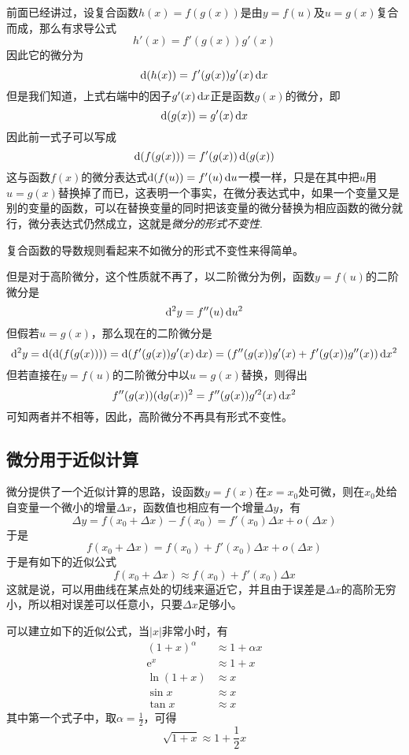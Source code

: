 前面已经讲过，设复合函数$h(x)=f(g(x))$是由$y=f(u)$及$u=g(x)$复合而成，那么有求导公式
\[ h'(x) = f'(g(x))g'(x) \]
因此它的微分为
\[ \mathop{}\!\mathrm{d} (h(x)) = f'(g(x)) g'(x) \mathop{}\!\mathrm{d} x \]
但是我们知道，上式右端中的因子$g'(x) \mathop{}\!\mathrm{d} x$正是函数$g(x)$的微分，即
\[ \mathop{}\!\mathrm{d} (g(x)) = g'(x) \mathop{}\!\mathrm{d} x \]
因此前一式子可以写成
\[ \mathop{}\!\mathrm{d} (f(g(x))) = f'(g(x)) \mathop{}\!\mathrm{d} (g(x)) \]
这与函数$f(x)$的微分表达式$\mathop{}\!\mathrm{d} (f(u)) = f'(u) \mathop{}\!\mathrm{d} u$一模一样，只是在其中把$u$用$u=g(x)$替换掉了而已，这表明一个事实，在微分表达式中，如果一个变量又是别的变量的函数，可以在替换变量的同时把该变量的微分替换为相应函数的微分就行，微分表达式仍然成立，这就是\emph{微分的形式不变性}.

复合函数的导数规则看起来不如微分的形式不变性来得简单。

但是对于高阶微分，这个性质就不再了，以二阶微分为例，函数$y=f(u)$的二阶微分是
\[ \mathop{}\!\mathrm{d}^2 y = f''(u) \mathop{}\!\mathrm{d} u^2 \]
但假若$u=g(x)$，那么现在的二阶微分是
\[ \mathop{}\!\mathrm{d}^2 y = \mathop{}\!\mathrm{d} (\mathop{}\!\mathrm{d} (f(g(x)))) = \mathop{}\!\mathrm{d} (f'(g(x))g'(x)\mathop{}\!\mathrm{d} x) = (f''(g(x))g'(x)+f'(g(x))g''(x)) \mathop{}\!\mathrm{d} x^2 \]
但若直接在$y=f(u)$的二阶微分中以$u=g(x)$替换，则得出
\[ f''(g(x)) (\mathop{}\!\mathrm{d} g(x))^2 = f''(g(x)) g'^2(x) \mathop{}\!\mathrm{d} x^2 \]
可知两者并不相等，因此，高阶微分不再具有形式不变性。

\subsection{微分用于近似计算}
\label{sec:approx-by-differtial}

微分提供了一个近似计算的思路，设函数$y=f(x)$在$x=x_0$处可微，则在$x_0$处给自变量一个微小的增量$\Delta x$，函数值也相应有一个增量$\Delta y$，有
\[ \Delta y = f(x_0+\Delta x) - f(x_0) = f'(x_0) \Delta x + o(\Delta x) \]
于是
\[ f(x_0+\Delta x) = f(x_0) + f'(x_0) \Delta x + o(\Delta x) \]
于是有如下的近似公式
\[ f(x_0+\Delta x) \approx f(x_0) + f'(x_0) \Delta x \]
这就是说，可以用曲线在某点处的切线来逼近它，并且由于误差是$\Delta x$的高阶无穷小，所以相对误差可以任意小，只要$\Delta x$足够小。

\begin{example}
  可以建立如下的近似公式，当$|x|$非常小时，有
  \begin{align*}
    (1+x)^{\alpha} & \approx 1 + \alpha x \\
    \mathrm{e}^x & \approx 1 + x \\
    \ln{(1+x)} & \approx x \\
    \sin{x} & \approx x \\
    \tan{x} & \approx x
  \end{align*}
  其中第一个式子中，取$\alpha=\frac{1}{2}$，可得
    \[ \sqrt{1+x} \approx 1 + \frac{1}{2}x \]
\end{example}



